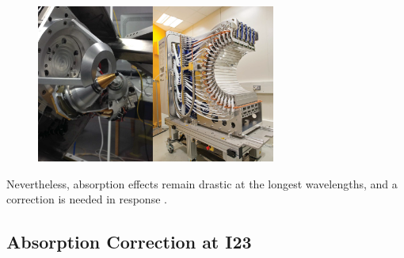 \begin{figure}
    \centering
    \includegraphics[width = 0.7\textwidth]{images/goniometer&detector.PNG}
    \caption{\cite{Wagner2016}}
    \label{fig:gonio_and_detector}
\end{figure}


Nevertheless, absorption effects remain drastic at the longest wavelengths, and a correction is needed in response \cite{Kazantsev2021}.

\subsection{Absorption Correction at I23}




